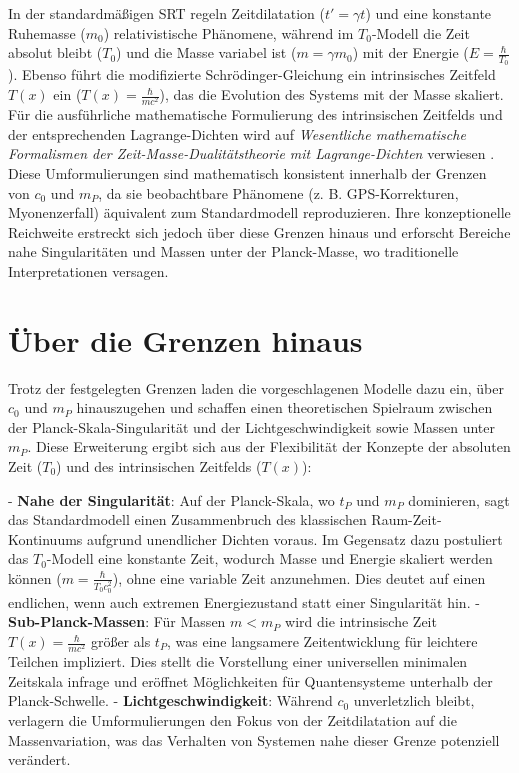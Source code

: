 \documentclass[a4paper,12pt]{article}
\newcommand{\Tfield}{T(x)}
\begin{document}
	In der standardmäßigen SRT regeln Zeitdilatation (\( t' = \gamma t \)) und eine konstante Ruhemasse (\( m_0 \)) relativistische Phänomene, während im \( T_0 \)-Modell die Zeit absolut bleibt (\( T_0 \)) und die Masse variabel ist (\( m = \gamma m_0 \)) mit der Energie (\( E = \frac{\hbar}{T_0} \)). Ebenso führt die modifizierte Schrödinger-Gleichung ein intrinsisches Zeitfeld \(\Tfield\) ein (\(\Tfield = \frac{\hbar}{m c^2}\)), das die Evolution des Systems mit der Masse skaliert. Für die ausführliche mathematische Formulierung des intrinsischen Zeitfelds und der entsprechenden Lagrange-Dichten wird auf \textit{Wesentliche mathematische Formalismen der Zeit-Masse-Dualitätstheorie mit Lagrange-Dichten} verwiesen \cite{wesentlicheFormalismen}\relax. Diese Umformulierungen sind mathematisch konsistent innerhalb der Grenzen von \( c_0 \) und \( m_P \), da sie beobachtbare Phänomene (z. B. GPS-Korrekturen, Myonenzerfall) äquivalent zum Standardmodell reproduzieren. Ihre konzeptionelle Reichweite erstreckt sich jedoch über diese Grenzen hinaus und erforscht Bereiche nahe Singularitäten und Massen unter der Planck-Masse, wo traditionelle Interpretationen versagen.
	
	\section{Über die Grenzen hinaus}
	Trotz der festgelegten Grenzen laden die vorgeschlagenen Modelle dazu ein, über \( c_0 \) und \( m_P \) hinauszugehen und schaffen einen theoretischen Spielraum zwischen der Planck-Skala-Singularität und der Lichtgeschwindigkeit sowie Massen unter \( m_P \). Diese Erweiterung ergibt sich aus der Flexibilität der Konzepte der absoluten Zeit (\( T_0 \)) und des intrinsischen Zeitfelds (\(\Tfield\)):
	
	- \textbf{Nahe der Singularität}: Auf der Planck-Skala, wo \( t_P \) und \( m_P \) dominieren, sagt das Standardmodell einen Zusammenbruch des klassischen Raum-Zeit-Kontinuums aufgrund unendlicher Dichten voraus. Im Gegensatz dazu postuliert das \( T_0 \)-Modell eine konstante Zeit, wodurch Masse und Energie skaliert werden können (\( m = \frac{\hbar}{T_0 c_0^2} \)), ohne eine variable Zeit anzunehmen. Dies deutet auf einen endlichen, wenn auch extremen Energiezustand statt einer Singularität hin.
	- \textbf{Sub-Planck-Massen}: Für Massen \( m < m_P \) wird die intrinsische Zeit \(\Tfield = \frac{\hbar}{m c^2} \) größer als \( t_P \), was eine langsamere Zeitentwicklung für leichtere Teilchen impliziert. Dies stellt die Vorstellung einer universellen minimalen Zeitskala infrage und eröffnet Möglichkeiten für Quantensysteme unterhalb der Planck-Schwelle.
	- \textbf{Lichtgeschwindigkeit}: Während \( c_0 \) unverletzlich bleibt, verlagern die Umformulierungen den Fokus von der Zeitdilatation auf die Massenvariation, was das Verhalten von Systemen nahe dieser Grenze potenziell verändert.
	
\end{document}
